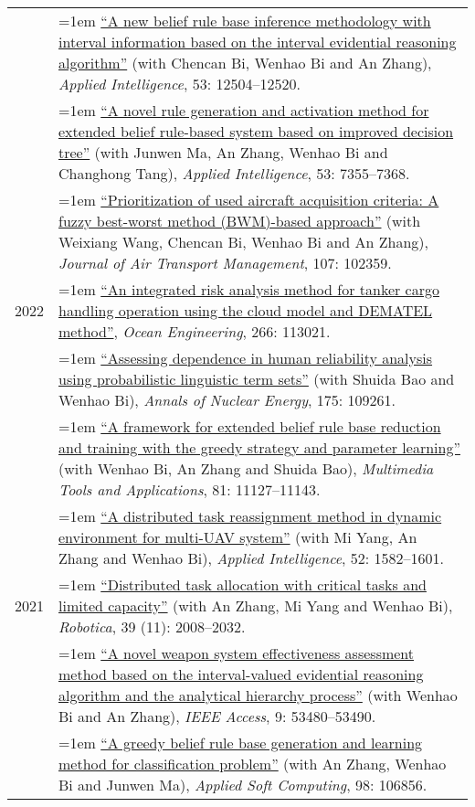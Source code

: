 \documentclass[11pt,english]{article}
\begin{document}
\begin{tabular}{p{.85in}>{\hangindent=1em}p{5.65in}<{\raggedright}}
 &  \href{https://doi.org/10.1007/s10489-022-04182-z}{``A new belief rule base inference methodology with interval information based on the interval evidential reasoning algorithm''} (with Chencan Bi, Wenhao Bi and An Zhang), \textit{Applied Intelligence}, 53: 12504--12520. \\

 &  \href{https://doi.org/10.1007/s10489-022-03803-x}{``A novel rule generation and activation method for extended belief rule-based system based on improved decision tree''} (with Junwen Ma, An Zhang, Wenhao Bi and Changhong Tang), \textit{Applied Intelligence}, 53: 7355--7368. \\

 &  \href{https://doi.org/10.1016/j.jairtraman.2023.102359}{``Prioritization of used aircraft acquisition criteria: A fuzzy best-worst method (BWM)-based approach''} (with Weixiang Wang, Chencan Bi, Wenhao Bi and An Zhang), \textit{Journal of Air Transport Management}, 107: 102359. \\
 
2022 &  \href{https://doi.org/10.1016/j.oceaneng.2022.113021}{``An integrated risk analysis method for tanker cargo handling operation using the cloud model and DEMATEL method''}, \textit{Ocean Engineering}, 266: 113021. \\

 &  \href{https://doi.org/10.1016/j.anucene.2022.109261}{``Assessing dependence in human reliability analysis using probabilistic linguistic term sets''} (with Shuida Bao and Wenhao Bi), \textit{Annals of Nuclear Energy}, 175: 109261. \\
 
 &  \href{https://doi.org/10.1007/s11042-022-12232-4}{``A framework for extended belief rule base reduction and training with the greedy strategy and parameter learning''} (with Wenhao Bi, An Zhang and Shuida Bao), \textit{Multimedia Tools and Applications}, 81: 11127--11143. \\
 &  \href{https://doi.org/10.1007/s10489-021-02502-3}{``A distributed task reassignment method in dynamic environment for multi-UAV system''} (with Mi Yang, An Zhang and Wenhao Bi), \textit{Applied Intelligence}, 52: 1582--1601. \\
2021 &  \href{https://doi.org/10.1017/S0263574721000102}{``Distributed task allocation with critical tasks and limited capacity''} (with An Zhang, Mi Yang and Wenhao Bi), \textit{Robotica}, 39 (11): 2008--2032. \\
 &  \href{https://doi.org/10.1109/ACCESS.2021.3071419}{``A novel weapon system effectiveness assessment method based on the interval-valued evidential reasoning algorithm and the analytical hierarchy process''} (with Wenhao Bi and An Zhang), \textit{IEEE Access}, 9: 53480--53490. \\
 &  \href{https://doi.org/10.1016/j.asoc.2020.106856}{``A greedy belief rule base generation and learning method for classification problem''} (with An Zhang, Wenhao Bi and Junwen Ma), \textit{Applied Soft Computing}, 98: 106856. \\


\end{tabular}
\end{document}
